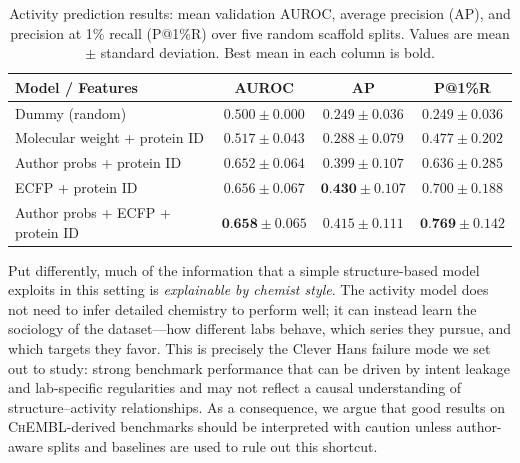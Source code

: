 \documentclass[11pt]{article}
\begin{document}
\begin{table}[t]
\centering
\caption{Activity prediction results: mean validation AUROC, average precision (AP), and precision at 1\% recall (P@1\%R) over five random scaffold splits. Values are mean $\pm$ standard deviation. Best mean in each column is bold.}
\label{tab:activity-results}
\begin{tabular}{@{}lccc@{}}
\toprule
\textbf{Model / Features} & \textbf{AUROC} & \textbf{AP} & \textbf{P@1\%R} \\
\midrule
Dummy (random) &
$0.500 \pm 0.000$ &
$0.249 \pm 0.036$ &
$0.249 \pm 0.036$ \\
Molecular weight + protein ID &
$0.517 \pm 0.043$ &
$0.288 \pm 0.079$ &
$0.477 \pm 0.202$ \\
Author probs + protein ID &
$0.652 \pm 0.064$ &
$0.399 \pm 0.107$ &
$0.636 \pm 0.285$ \\
ECFP + protein ID &
$0.656 \pm 0.067$ &
$\textbf{0.430} \pm 0.107$ &
$0.700 \pm 0.188$ \\
Author probs + ECFP + protein ID &
$\textbf{0.658} \pm 0.065$ &
$0.415 \pm 0.111$ &
$\textbf{0.769}\pm 0.142$ \\
\bottomrule
\end{tabular}
\end{table}

Put differently, much of the information that a simple structure-based model exploits in this setting is \emph{explainable by chemist style}. The activity model does not need to infer detailed chemistry to perform well; it can instead learn the sociology of the dataset---how different labs behave, which series they pursue, and which targets they favor. This is precisely the Clever Hans failure mode we set out to study: strong benchmark performance that can be driven by intent leakage and lab-specific regularities and may not reflect a causal understanding of structure--activity relationships. As a consequence, we argue that good results on \textsc{ChEMBL}-derived benchmarks should be interpreted with caution unless author-aware splits and baselines are used to rule out this shortcut.
\end{document}

